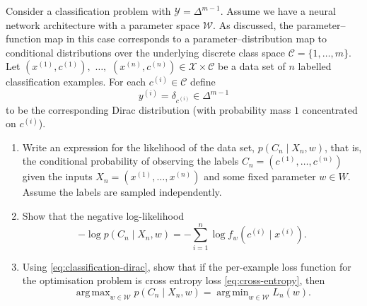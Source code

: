 \documentclass[11pt]{article}
\DeclareMathOperator*{\argmin}{arg\,min}
\DeclareMathOperator*{\argmax}{arg\,max}
\newcommand{\X}{\mathcal{X}}
\newcommand{\Y}{\mathcal{Y}}
\newcommand{\W}{\mathcal{W}}
\newcommand{\C}{\mathcal{C}}
\begin{document}
\begin{exercise}
    \label{ex:nll-cross-entropy}
    Consider a classification problem with $\Y = \Delta^{m-1}$. Assume we have
    a neural network architecture with a parameter space $\W$. As discussed,
    the parameter--function map in this case corresponds to a
    parameter--distribution map to conditional distributions over the
    underlying discrete class space $\C = \{1, \ldots, m\}$.
    Let 
        $(x^{(1)}, c^{(1)}),$ $\ldots,$ $(x^{(n)}, c^{(n)}) \in \X \times \C$
    be a data set of $n$ labelled classification examples.
    For each $c^{(i)} \in \C$ define
    \begin{equation}\label{eq:classification-dirac}
        y^{(i)} = \delta_{c^{(i)}} \in \Delta^{m-1}
    \end{equation}
    to be the corresponding Dirac distribution (with
    probability mass $1$ concentrated on $c^{(i)}$).
\begin{enumerate}
    \item
        Write an expression for the likelihood of the data set,
            $p(C_n \mid X_n, w)$,
        that is, the conditional probability of observing the labels
            $C_n = (c^{(1)}, \ldots, c^{(n)})$
        given the inputs
            $X_n = (x^{(1)}, \ldots, x^{(n)})$
        and some fixed parameter $w \in W$. Assume the labels are sampled
        independently.
    \item
        Show that the negative log-likelihood
            $$
            -\log p(C_n \mid X_n, w)
            = - \sum_{i=1}^n \log f_w(c^{(i)} \mid x^{(i)})
            .
            $$
    \item
        Using \eqref{eq:classification-dirac}, show that if the per-example loss
        function for the optimisation problem is cross entropy loss
            \eqref{eq:cross-entropy},
        then
        $$
            \argmax_{w \in \W} p(C_n \mid X_n, w)
            =
            \argmin_{w \in \W} L_n(w)
        .$$
\end{enumerate}
\end{exercise}
\end{document}
